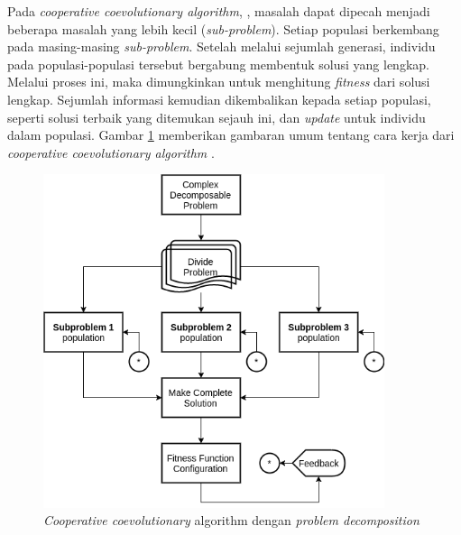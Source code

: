 Pada \textit{cooperative coevolutionary algorithm}, \citep{engelbrecht_coevolution_2007}, masalah dapat dipecah menjadi beberapa masalah yang lebih kecil (\textit{sub-problem}). Setiap populasi berkembang pada masing-masing \textit{sub-problem}. Setelah melalui sejumlah generasi, individu pada populasi-populasi tersebut bergabung membentuk solusi yang lengkap. Melalui proses ini, maka dimungkinkan untuk menghitung \textit{fitness} dari solusi lengkap. Sejumlah informasi kemudian dikembalikan kepada setiap populasi, seperti solusi terbaik yang ditemukan sejauh ini, dan \textit{update} untuk individu dalam populasi. Gambar \ref{fig:coes_overview} memberikan gambaran umum tentang cara kerja dari \textit{cooperative coevolutionary algorithm} \citep{de_oliveira_cooperative_2016}.


\begin{figure}[!]
	\centering
	\includegraphics[width=10cm]{../../Resources/Images/coes_overview}
	\caption{\textit{Cooperative coevolutionary} algorithm dengan \textit{problem decomposition}}
	\label{fig:coes_overview}
\end{figure} 


